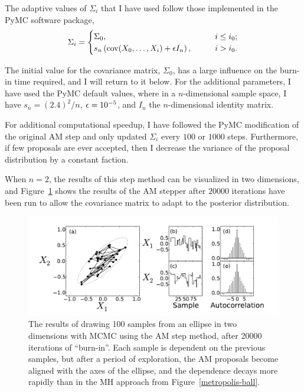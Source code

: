 The adaptive values of $\Sigma_i$ that I have used follow those
implemented in the PyMC software package,\cite{patil_pymc:_2010}
\[
\Sigma_i = \begin{cases}
\Sigma_0, &\qquad i \leq i_0;\\
s_n \left(\operatorname{cov}(X_0, \ldots, X_i) + \epsilon I_n\right), &\qquad i > i_0.
\end{cases}
\]

The initial value for the covariance matrix, $\Sigma_0$, has a large
influence on the burn-in time required, and I will return to it below.
For the additional parameters, I have used the PyMC default values,
where in a $n$-dimensional sample space, I have $s_n = (2.4)^2/n$, $\epsilon
= 10^{-5}$, and $I_n$ the $n$-dimensional identity matrix.

For additional computational speedup, I have followed the PyMC
modification of the original AM step and only updated $\Sigma_i$ every
$100$ or $1000$ steps.  Furthermore, if few proposals are
ever accepted, then I decrease the variance of the
proposal distribution by a constant faction.

When $n=2$, the results of this step method can be visualized in two
dimensions, and Figure~\ref{am-ball} shows the results of the AM
stepper after $20000$ iterations have been run to allow the covariance
matrix to adapt to the posterior distribution.

\begin{figure}[ht]
\begin{center}
\includegraphics[width=\textwidth]{am-ball-2.pdf}
\caption{The results of drawing 100 samples from an ellipse in two
  dimensions with MCMC using the AM step method, after 20000
  iterations of ``burn-in''.  Each sample is dependent on the previous
  samples, but after a period of exploration, the AM proposals become
  aligned with the axes of the ellipse, and the dependence decays more
  rapidly than in the MH approach from Figure~\ref{metropolis-ball}.}
\label{am-ball}
\end{center}
\end{figure}

